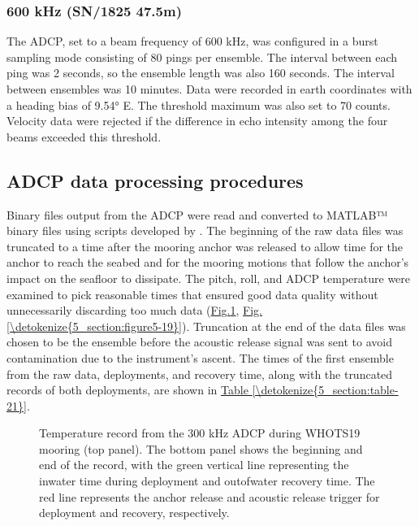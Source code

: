 \documentclass[a4paper,10pt,english,openany,oneside]{sphinxmanual}
\let\sphinxpxdimen\pdfpxdimen\else\newdimen\sphinxpxdimen
\begin{document}
\subsubsection{600 kHz (SN/1825\sphinxhyphen{} 47.5m)}
\label{\detokenize{5_section:khz-sn-1825-47-5m}}
\sphinxAtStartPar
The ADCP, set to a beam frequency of 600 kHz, was configured in a burst
sampling mode consisting of 80 pings per ensemble. The interval between each
ping was 2 seconds, so the ensemble length was also 160 seconds. The interval
between ensembles was 10 minutes. Data were recorded in earth coordinates with
a heading bias of 9.54° E. The threshold maximum was also set to 70 counts.
Velocity data were rejected if the difference in echo intensity among the four
beams exceeded this threshold.


\subsection{ADCP data processing procedures}
\label{\detokenize{5_section:adcp-data-processing-procedures}}
\sphinxAtStartPar
Binary files output from the ADCP were read and converted to MATLAB™ binary
files using scripts developed by
. The beginning of
the raw data files was truncated to a time after the mooring anchor was
released to allow time for the anchor to reach the seabed and for the mooring
motions that follow the anchor’s impact on the seafloor to dissipate. The
pitch, roll, and ADCP temperature were examined to pick reasonable times that
ensured good data quality without unnecessarily discarding too much data
(\hyperref[\detokenize{5_section:figure5-18}]{Fig.\@ \ref{\detokenize{5_section:figure5-18}}}, \hyperref[\detokenize{5_section:figure5-19}]{Fig.\@ \ref{\detokenize{5_section:figure5-19}}}). Truncation at the end of the data
files was chosen to be the ensemble before the acoustic release signal was sent
to avoid contamination due to the instrument’s ascent. The times of the first
ensemble from the raw data, deployments, and recovery time, along with the
truncated records of both deployments, are shown in \hyperref[\detokenize{5_section:table-21}]{Table \ref{\detokenize{5_section:table-21}}}.

\begin{figure}[htbp]
\centering
\capstart

\noindent\sphinxincludegraphics[height=500\sphinxpxdimen]{{300_rawt_plt}.png}
\caption{Temperature record from the 300 kHz ADCP during WHOTS\sphinxhyphen{}19 mooring (top panel).
The bottom panel shows the beginning and end of the record, with the green
vertical line representing the in\sphinxhyphen{}water time during deployment and out\sphinxhyphen{}of\sphinxhyphen{}water
recovery time. The red line represents the anchor release and acoustic release
trigger for deployment and recovery, respectively.}\label{\detokenize{5_section:figure5-18}}\end{figure}
\end{document}
